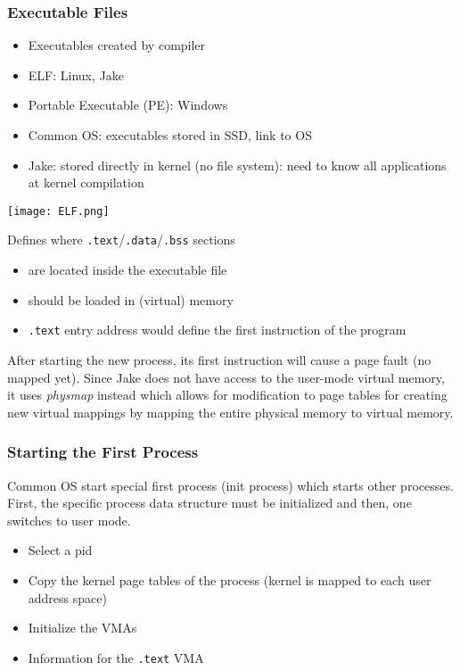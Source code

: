 \subsubsection{Executable Files}
\begin{itemize}
    \item Executables created by compiler
    \item ELF: Linux, Jake
    \item Portable Executable (PE): Windows
    \item Common OS: executables stored in SSD, link to OS
    \item Jake: stored directly in kernel (no file system): need to know all applications at kernel compilation
\end{itemize}
\newpar{}
\newpar{}
\begin{center}
    \texttt{[image: ELF.png]}
\end{center}
Defines where \texttt{.text}/\texttt{.data}/\texttt{.bss} sections
\begin{itemize}
    \item are located inside the executable file
    \item should be loaded in (virtual) memory
    \item \texttt{.text} entry address would define the first instruction of the program
\end{itemize} 

\newpar{}

After starting the new process, its first instruction will cause a page fault (no mapped yet). Since Jake does not have access to the user-mode virtual memory, it uses \textit{physmap} instead which allows for modification to page tables for creating new virtual mappings by mapping the entire physical memory to virtual memory.


\subsubsection{Starting the First Process}
Common OS start special first process (init process) which starts other processes. First, the specific process data structure must be initialized and then, one switches to user mode.
\begin{itemize}
    \item Select a pid
    \item Copy the kernel page tables of the process (kernel is mapped to each user address space)
    \item Initialize the VMAs
    \item Information for the \texttt{.text} VMA
\end{itemize}

